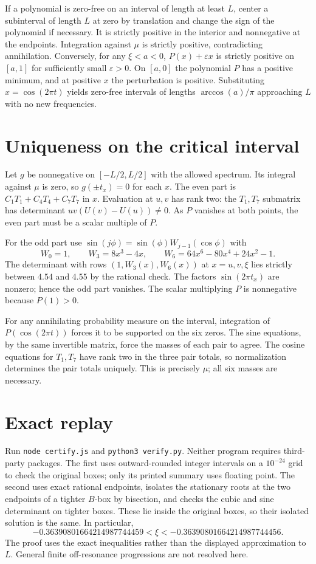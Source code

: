 \documentclass[11pt]{article}
\begin{document}
If a polynomial is zero-free on an interval of length at least \(L\),
center a subinterval of length \(L\) at zero by translation and change
the sign of the polynomial if necessary. It is strictly positive
in the interior and nonnegative at the endpoints. Integration against
\(\mu\) is strictly positive, contradicting annihilation.
Conversely, for any \(\xi<a<0\), \(P(x)+\varepsilon x\) is strictly
positive on \([a,1]\) for sufficiently small \(\varepsilon>0\).
On \([a,0]\) the polynomial \(P\) has a positive minimum, and at
positive \(x\) the perturbation is positive. Substituting
\(x=\cos(2\pi t)\) yields zero-free intervals of lengths
\(\arccos(a)/\pi\) approaching \(L\) with no new frequencies.

\clearpage
\section{Uniqueness on the critical interval}
Let \(g\) be nonnegative on \([-L/2,L/2]\) with the allowed spectrum.
Its integral against \(\mu\) is zero, so \(g(\pm t_x)=0\) for each \(x\).
The even part is \(C_1T_1+C_4T_4+C_7T_7\) in \(x\). Evaluation at
\(u,v\) has rank two: the \(T_1,T_7\) submatrix has determinant
\(uv(U(v)-U(u))\ne 0\). As \(P\) vanishes at both points, the even
part must be a scalar multiple of \(P\).

For the odd part use
\(\sin(j\phi)=\sin(\phi)W_{j-1}(\cos\phi)\) with
\[
 W_0=1,\qquad W_3=8x^3-4x,\qquad
 W_6=64x^6-80x^4+24x^2-1 .
\]
The determinant with rows \((1,W_3(x),W_6(x))\) at \(x=u,v,\xi\)
lies strictly between \(4.54\) and \(4.55\) by the rational check.
The factors \(\sin(2\pi t_x)\) are nonzero; hence the odd part vanishes.
The scalar multiplying \(P\) is nonnegative because \(P(1)>0\).

For any annihilating probability measure on the interval,
integration of \(P(\cos(2\pi t))\) forces it to be supported
on the six zeros. The sine equations, by the same invertible matrix,
force the masses of each pair to agree. The cosine equations for
\(T_1,T_7\) have rank two in the three pair totals, so normalization
determines the pair totals uniquely. This is precisely \(\mu\);
all six masses are necessary.

\section{Exact replay}\label{sec:check}
Run \texttt{node certify.js} and \texttt{python3 verify.py}. Neither
program requires third-party packages. The first uses outward-rounded
integer intervals on a \(10^{-24}\) grid to check the original boxes;
only its printed summary uses floating point. The second uses
exact rational endpoints, isolates the stationary roots at the two
endpoints of a tighter \(B\)-box by bisection, and checks the cubic and
sine determinant on tighter boxes. These lie inside the original boxes,
so their isolated solution is the same. In particular,
\[
 -0.36390801664214987744459<\xi<-0.36390801664214987744456.
\]
The proof uses the exact inequalities rather than the displayed
approximation to \(L\). General finite off-resonance progressions are
not resolved here.
\end{document}
